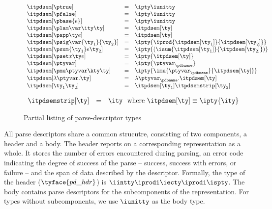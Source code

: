 \begin{figure}
\fbox{$\itpdsem[\ty] = \ity$}
\[ 
\begin{array}{lcl} 
\itpdsem[\ptrue] & = & \ipty \iunitty \\                                                  
\itpdsem[\pfalse] & = & \ipty \iunitty \\                                                  
\itpdsem[\pbase{e}] & = & \ipty \iunitty\\
\itpdsem[\plam \var \ity \ty] & = & \itpdsem[\ty] \\
\itpdsem[\papp \ty e] & = & \itpdsem[\ty] \\
\itpdsem[\psig \var {\ty_1} {\ty_2}] & = & 
               \ipty {\iprod {\itpdsem[\ty_1]} {\itpdsem[\ty_2]}} \\
\itpdsem[\psum {\ty_1} e {\ty_2}] & = & 
               \ipty {(\isum {\itpdsem[\ty_1]} {\itpdsem[\ty_2]})} \\
\itpdsem[\pset x \ty e] & = & \ipty {\itpdsem[\ty]} \\
\itpdsem[\ptyvar] & = & \ipty{\ptyvar_\pdbname} \\
\itpdsem[\pmu \ptyvar \kty \ty] & = & 
  \ipty{\imu{\ptyvar_\pdbname}{\itpdsem[\ty]}} \\
\itpdsem[\lambda \ptyvar.\ty]      
     & = & \lambda \ptyvar_\pdbname.\itpdsem[\ty] \\
\itpdsem[\ty_1 \ty_2]            & = & \itpdsem[\ty_1] \itpdsemstrip[\ty_2] \\
\end{array}
\]

\fbox{$\itpdsemstrip[\ty] = \ity$}

\[
\begin{array}{lcl} 
\itpdsemstrip[\ty] & = & \ity \ \ \mbox{where}\ \itpdsem[\ty] \equiv \ipty{\ity}
\end{array}
\]
\caption{Partial listing of parse-descriptor types}
\label{fig:pd-tys}
\end{figure}

All parse descriptors share a common strucutre, consisting of two
components, a header and a body.  The header reports on a
corresponding representation as a whole. It stores the number of
errors encountered during parsing, an error code indicating the degree
of success of the parse -- success, success with errors, or failure --
and the span of data described by the descriptor.  Formally, the type
of the header ($\tyface{pd\_hdr}$) is $\iintty \iprodi \iecty \iprodi
\ispty$. The body contains parse descriptors for the subcomponents of
the representation. For types without subcomponents, we use $\iunitty$
as the body type.


